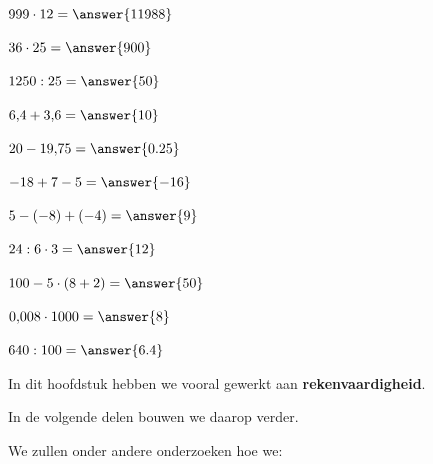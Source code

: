 \documentclass{ximera}
\begin{document}
\begin{oefening}{\oefB\ESS}
\begin{question} \(999\cdot12=\answer{11988}\) \end{question}

\begin{question} \(36\cdot25=\answer{900}\) \end{question}

\begin{question} \(1250:25=\answer{50}\) \end{question}

\begin{question} \(6{,}4+3{,}6=\answer{10}\) \end{question}

\begin{question} \(20-19{,}75=\answer{0.25}\) \end{question}

\begin{question} \(-18+7-5=\answer{-16}\) \end{question}

\begin{question} \(5-(-8)+(-4)=\answer{9}\) \end{question}

\begin{question} \(24:6\cdot3=\answer{12}\) \end{question}

\begin{question} \(100-5\cdot(8+2)=\answer{50}\) \end{question}

\begin{question} \(0{,}008\cdot1000=\answer{8}\) \end{question}

\begin{question} \(640:100=\answer{6.4}\) \end{question}

\end{oefening}




In dit hoofdstuk hebben we vooral gewerkt aan \textbf{rekenvaardigheid}.

In de volgende delen bouwen we daarop verder.

We zullen onder andere onderzoeken hoe we:
\end{document}
